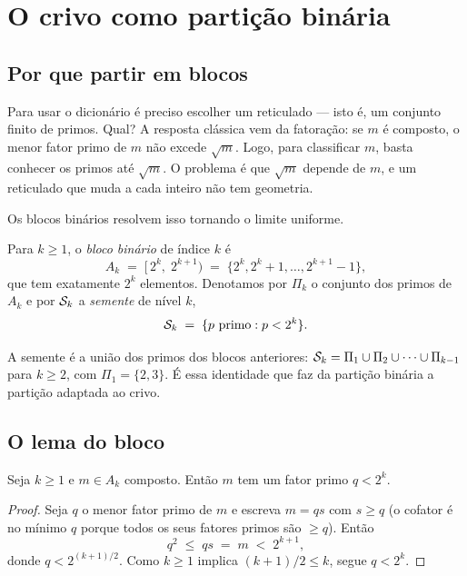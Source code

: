 \section{O crivo como partição binária}\label{sec:blocos}

\subsection{Por que partir em blocos}

Para usar o dicionário é preciso escolher um reticulado — isto é, um conjunto
finito de primos. Qual? A resposta clássica vem da fatoração: se $m$ é composto,
o menor fator primo de $m$ não excede $\sqrt m$. Logo, para classificar $m$,
basta conhecer os primos até $\sqrt m$. O problema é que $\sqrt m$ depende de
$m$, e um reticulado que muda a cada inteiro não tem geometria.

Os blocos binários resolvem isso tornando o limite uniforme.

\begin{definicao}\label{def:bloco}
Para $k\ge1$, o \emph{bloco binário} de índice $k$ é
\[
  A_k \;=\; [\,2^k,\;2^{k+1}) \;=\; \{2^k, 2^k+1,\dots, 2^{k+1}-1\},
\]
que tem exatamente $2^k$ elementos. Denotamos por $\Pi_k$ o conjunto dos primos
de $A_k$ e por $\mathcal{S}_k$ a \emph{semente} de nível $k$,
\[
  \mathcal{S}_k \;=\; \{p \text{ primo} : p < 2^k\} .
\]
\end{definicao}

A semente é a união dos primos dos blocos anteriores:
$\mathcal{S}_k=\Pi_1\cup\Pi_2\cup\cdots\cup\Pi_{k-1}$ para $k\ge2$, com
$\Pi_1=\{2,3\}$. É essa identidade que faz da partição binária a partição
adaptada ao crivo.

\subsection{O lema do bloco}

\begin{lema}\label{lema:bloco}
Seja $k\ge1$ e $m\in A_k$ composto. Então $m$ tem um fator primo $q<2^k$.
\end{lema}

\begin{proof}
Seja $q$ o menor fator primo de $m$ e escreva $m=qs$ com $s\ge q$ (o cofator é no
mínimo $q$ porque todos os seus fatores primos são $\ge q$). Então
\[
  q^2 \;\le\; qs \;=\; m \;<\; 2^{k+1},
\]
donde $q<2^{(k+1)/2}$. Como $k\ge1$ implica $(k+1)/2\le k$, segue $q<2^k$.
\end{proof}

